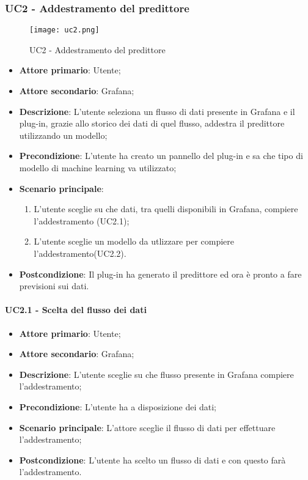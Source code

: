 \newpage
\subsubsection{UC2 - Addestramento del predittore}
\label{sssec:uc2}

\begin{figure}[h!]
  \begin{center}
    \texttt{[image: uc2.png]}\\
    \caption{UC2 - Addestramento del predittore}%
    \label{fig:uc2}
  \end{center}
\end{figure}

\begin{itemize}
  \item \textbf{Attore primario}:  Utente;
  \item \textbf{Attore secondario}: Grafana;
  \item \textbf{Descrizione}: L'utente seleziona un flusso di dati presente in Grafana e il plug-in, grazie allo storico dei dati di quel flusso, addestra il predittore utilizzando un modello;
  \item \textbf{Precondizione}: L'utente ha creato un pannello del plug-in e sa che tipo di modello di machine learning va utilizzato;
  \item \textbf{Scenario principale}:
  \begin{enumerate}
    \item L'utente sceglie su che dati, tra quelli disponibili in Grafana, compiere l'addestramento (UC2.1);
    \item L'utente sceglie un modello da utlizzare per compiere l'addestramento(UC2.2).
  \end{enumerate}
  \item \textbf{Postcondizione}: Il plug-in ha generato il predittore ed ora è pronto a fare previsioni sui dati.
\end{itemize}

\paragraph{UC2.1 - Scelta del flusso dei dati}
\label{para:uc2.1}
\begin{itemize}
  \item \textbf{Attore primario}: Utente;
  \item \textbf{Attore secondario}: Grafana;
  \item \textbf{Descrizione}: L'utente sceglie su che flusso presente in Grafana compiere l'addestramento;
  \item \textbf{Precondizione}: L'utente ha a disposizione dei dati;
  \item \textbf{Scenario principale}: L'attore sceglie il flusso di dati per effettuare l'addestramento;
  \item \textbf{Postcondizione}: L'utente ha scelto un flusso di dati e con questo farà l'addestramento.
\end{itemize}

